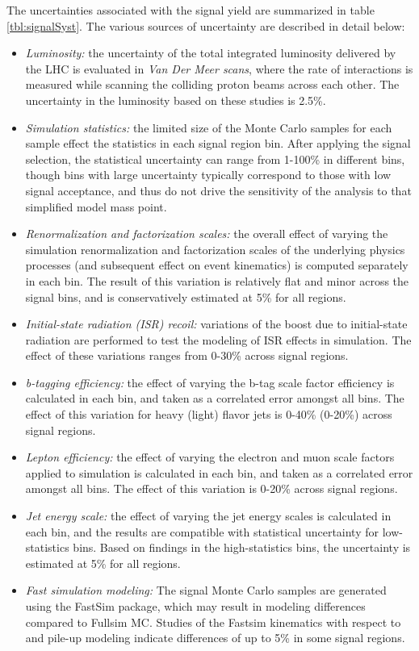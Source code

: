 The uncertainties associated with the signal yield are summarized in table \ref{tbl:signalSyst}. The various sources of uncertainty are described in detail below:
\begin{itemize}
	\item {\it Luminosity:} the uncertainty of the total integrated luminosity delivered by the LHC is evaluated in {\it Van Der Meer scans}, where the rate of interactions is measured while scanning the colliding proton beams across each other. The uncertainty in the luminosity based on these studies is 2.5\%.
	\item {\it Simulation statistics:} the limited size of the Monte Carlo samples for each sample effect the statistics in each signal region bin. After applying the signal selection, the statistical uncertainty can range from 1-100\% in different bins, though bins with large uncertainty typically correspond to those with low signal acceptance, and thus do not drive the sensitivity of the analysis to that simplified model mass point.
	\item {\it Renormalization and factorization scales:} the overall effect of varying the simulation renormalization and factorization scales of the underlying physics processes (and subsequent effect on event kinematics) is computed separately in each bin. The result of this variation is relatively flat and minor across the signal bins, and is conservatively estimated at 5\% for all regions.
	\item {\it Initial-state radiation (ISR) recoil:} variations of the boost due to initial-state radiation are performed to test the modeling of ISR effects in simulation. The effect of these variations ranges from 0-30\% across signal regions.
	\item {\it b-tagging efficiency:} the effect of varying the b-tag scale factor efficiency is calculated in each bin, and taken as a correlated error amongst all bins. The effect of this variation for heavy (light) flavor jets is 0-40\% (0-20\%) across signal regions.
	\item {\it Lepton efficiency:} the effect of varying the electron and muon scale factors applied to simulation is calculated in each bin, and taken as a correlated error amongst all bins. The effect of this variation is 0-20\% across signal regions.
	\item {\it Jet energy scale:} the effect of varying the jet energy scales is calculated in each bin, and the results are compatible with statistical uncertainty for low-statistics bins. Based on findings in the high-statistics bins, the uncertainty is estimated at 5\% for all regions.
	\item {\it Fast simulation modeling:} The signal Monte Carlo samples are generated using the FastSim package, which may result in modeling differences compared to Fullsim MC. Studies of the Fastsim kinematics with respect to \MET and pile-up modeling indicate differences of up to 5\% in some signal regions.
\end{itemize}

